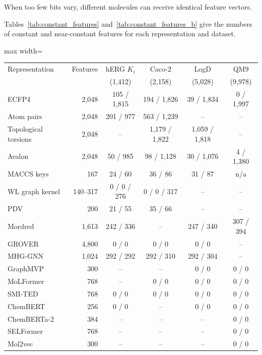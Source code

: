 When too few bits vary, different molecules can receive identical feature vectors.

Tables~\ref{tab:constant_features} and~\ref{tab:constant_features_b} give the numbers of constant and near-constant features for each representation and dataset.

\begin{table}[htbp]
\centering
\small
\setlength{\tabcolsep}{4pt}
\begin{adjustbox}{max width=\textwidth}
\begin{tabular}{lrcccc}
\toprule
Representation & Features & hERG $K_i$ & Caco-2 & LogD & QM9 \\
 & & (1,412) & (2,158) & (5,028) & (9,978) \\
\midrule
ECFP4 & 2,048 & 105 / 1,815 & 194 / 1,826 & 39 / 1,834 & 0 / 1,997 \\
Atom pairs & 2,048 & 201 / 977 & 563 / 1,239 & -- & -- \\
Topological torsions & 2,048 & -- & 1,179 / 1,822 & 1,059 / 1,818 & -- \\
Avalon & 2,048 & 50 / 985 & 98 / 1,128 & 30 / 1,076 & 4 / 1,380 \\
MACCS keys & 167 & 24 / 60 & 36 / 86 & 31 / 87 & n/a \\
WL graph kernel & 140--317 & 0 / 0 / 276 & 0 / 0 / 317 & -- & -- \\
PDV & 200 & 21 / 55 & 35 / 66 & -- & -- \\
Mordred & 1,613 & 242 / 336 & -- & 247 / 340 & 307 / 394 \\
GROVER & 4,800 & 0 / 0 & 0 / 0 & 0 / 0 & -- \\
MHG-GNN & 1,024 & 292 / 292 & 292 / 310 & 292 / 304 & -- \\
GraphMVP & 300 & -- & -- & 0 / 0 & 0 / 0 \\
MoLFormer & 768 & -- & 0 / 0 & 0 / 0 & 0 / 0 \\
SMI-TED & 768 & 0 / 0 & 0 / 0 & 0 / 0 & 0 / 0 \\
ChemBERT & 256 & 0 / 0 & -- & 0 / 0 & 0 / 0 \\
ChemBERTa-2 & 384 & -- & -- & -- & 0 / 0 \\
SELFormer & 768 & -- & -- & -- & 0 / 0 \\
Mol2vec & 300 & -- & -- & -- & 0 / 0 \\
\bottomrule
\end{tabular}

\end{adjustbox}
\end{table}
